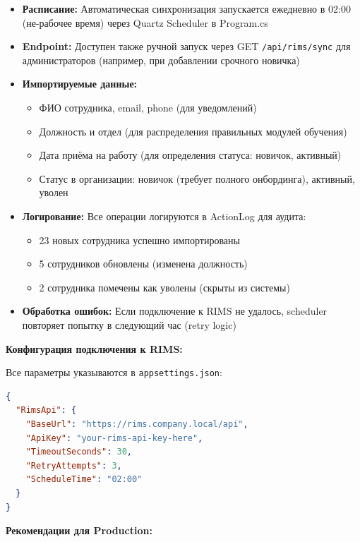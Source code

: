 \begin{itemize}
	\item \textbf{Расписание:} Автоматическая синхронизация запускается ежедневно в 02:00 (не-рабочее время) через Quartz Scheduler в Program.cs
	\item \textbf{Endpoint:} Доступен также ручной запуск через GET \texttt{/api/rims/sync} для администраторов (например, при добавлении срочного новичка)
	\item \textbf{Импортируемые данные:} 
	\begin{itemize}
		\item ФИО сотрудника, email, phone (для уведомлений)
		\item Должность и отдел (для распределения правильных модулей обучения)
		\item Дата приёма на работу (для определения статуса: новичок, активный)
		\item Статус в организации: новичок (требует полного онбординга), активный, уволен
	\end{itemize}
	\item \textbf{Логирование:} Все операции логируются в ActionLog для аудита:
	\begin{itemize}
		\item 23 новых сотрудника успешно импортированы
		\item 5 сотрудников обновлены (изменена должность)
		\item 2 сотрудника помечены как уволены (скрыты из системы)
	\end{itemize}
	\item \textbf{Обработка ошибок:} Если подключение к RIMS не удалось, scheduler повторяет попытку в следующий час (retry logic)
\end{itemize}

\textbf{Конфигурация подключения к RIMS:}

Все параметры указываются в \texttt{appsettings.json}:

\begin{lstlisting}[language=json, caption=Конфигурация RIMS в appsettings.json]
{
  "RimsApi": {
    "BaseUrl": "https://rims.company.local/api",
    "ApiKey": "your-rims-api-key-here",
    "TimeoutSeconds": 30,
    "RetryAttempts": 3,
    "ScheduleTime": "02:00"
  }
}
\end{lstlisting}

\textbf{Рекомендации для Production:}

